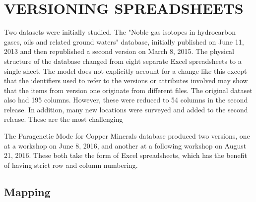 
\chapter{VERSIONING SPREADSHEETS}

Two datasets were initially studied.  The "Noble gas isotopes in hydrocarbon gases, oils and related ground waters" database, initially published on June 11, 2013 and then republished a second version on March 8, 2015.  The physical structure of the database changed from eight separate Excel spreadsheets to a single sheet.  The model does not explicitly account for a change like this except that the identifiers used to refer to the versions or attributes involved may show that the items from version one originate from different files.  The original dataset also had 195 columns.  However, these were reduced to 54 columns in the second release.  In addition, many new locations were surveyed and added to the second release.  These are the most challenging 

The Paragenetic Mode for Copper Minerals database produced two versions, one at a workshop on June 8, 2016, and another at a following workshop on August 21, 2016.  These both take the form of Excel spreadsheets, which has the benefit of having strict row and column numbering. 

\section{Mapping}